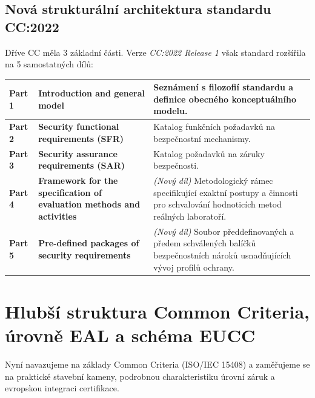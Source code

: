 \documentclass[10pt,a4paper]{article}
\begin{document}
	\subsection{Nová strukturální architektura standardu CC:2022}
	Dříve CC měla 3 základní části. Verze \textit{CC:2022 Release 1} však standard rozšířila na 5 samostatných dílů:
	\begin{center}
		\small
		\begin{tabular}{|l|p{6.38cm}|p{8.62cm}|}
			\hline
			\textbf{Part 1} & \textbf{Introduction and general model} & Seznámení s filozofií standardu a definice obecného konceptuálního modelu.\\ \hline
			\textbf{Part 2} & \textbf{Security functional requirements (SFR)} & Katalog funkčních požadavků na bezpečnostní mechanismy.\\ \hline
			\textbf{Part 3} & \textbf{Security assurance requirements (SAR)} & Katalog požadavků na záruky bezpečnosti.\\ \hline
			\textbf{Part 4} & \textbf{Framework for the specification of evaluation methods and activities} & \textit{(Nový díl)} Metodologický rámec specifikující exaktní postupy a činnosti pro schvalování hodnoticích metod reálných laboratoří.\\ \hline
			\textbf{Part 5} & \textbf{Pre-defined packages of security requirements} & \textit{(Nový díl)} Soubor předdefinovaných a předem schválených balíčků bezpečnostních nároků usnadňujících vývoj profilů ochrany.\\ \hline
		\end{tabular}
	\end{center}
	
	
	\section{Hlubší struktura Common Criteria, úrovně EAL a schéma EUCC}
	
	Nyní navazujeme na základy Common Criteria (ISO/IEC 15408) a zaměřujeme se na praktické stavební kameny, podrobnou charakteristiku úrovní záruk a evropskou integraci certifikace.
	
\end{document}
